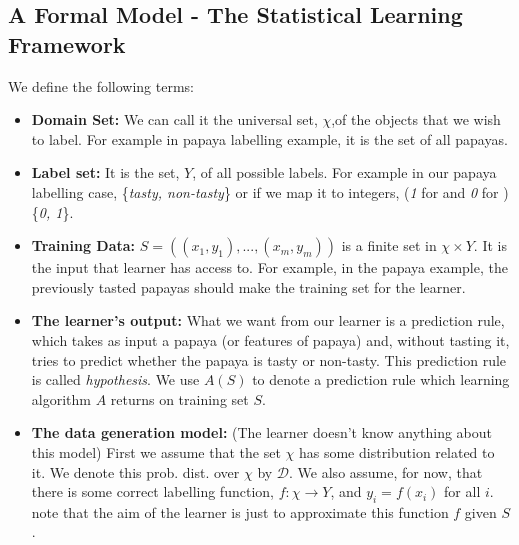 \documentclass[a4paper]{article}
\begin{document}
\subsection{A Formal Model - The Statistical Learning Framework}
We define the following terms:
\begin{itemize}
    \item \textbf{Domain Set:} We can call it the universal set, $\chi$,of the objects that we wish to label. For example in papaya labelling example, it is the set of all papayas.
    \item \textbf{Label set: } It is the set, $Y$, of all possible labels. For example in our papaya labelling case, \{\textit{tasty, non-tasty}\} or if we map it to integers, (\textit{1} for  and \textit{0} for ) \{\textit{0, 1}\}.
    \item \textbf{Training Data: } $S = ((x_1, y_1),...,(x_m,y_m))$ is a finite set in $\chi \times Y$. It is the input that learner has access to. For example, in the papaya example, the previously tasted papayas should make the training set for the learner.
    \item \textbf{The learner's output: } What we want from our learner is a prediction rule, which takes as input a papaya (or features of papaya) and, without tasting it, tries to predict whether the papaya is tasty or non-tasty. This prediction rule is called \textit{hypothesis}. We use $A(S)$ to denote a prediction rule which learning algorithm $A$ returns on training set $S$.
    \item \textbf{The data generation model: } (The learner doesn't know anything about this model) First we assume that the set $\chi$ has some distribution related to it. We denote this prob. dist. over $\chi$ by $\mathcal{D}$. We also assume, for now, that there is some correct labelling function, $f: \chi \to Y$, and $y_i = f(x_i)$ for all $i$. note that the aim of the learner is just to approximate this function $f$ given $S$.
    
\end{itemize}
\end{document}
